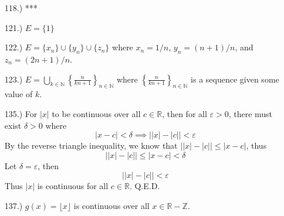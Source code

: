 \documentclass[12pt]{article}
\newcommand{\vertb}[1]{\left\vert#1\right\vert}
\newcommand{\e}{\varepsilon}
\newcommand{\lm}[1]{\displaystyle\lim_{#1}}
\begin{document}
\begin{itemize}


    \item [118.)] ***



    \item [121.)] $E=\{1\}$

    \item [122.)] $E=\{x_n\}\cup\{y_n\}\cup\{z_n\}$ where $x_n=1/n$, $y_n=(n+1)/n$, and $z_n=(2n+1)/n$.

    \item [123.)] $E=\displaystyle\bigcup_{k\in\mathbb{N}}\left\{\frac{n}{kn+1}\right\}_{n\in\mathbb{N}}$ where $\displaystyle\left\{\frac{n}{kn+1}\right\}_{n\in\mathbb{N}}$ is a sequence given some value of $k$.




    \item [135.)] For $\vertb{x}$ to be continuous over all $c\in\mathbb{R}$, then for all $\e>0$, there must exist $\delta>0$ where
    \[\vertb{x-c}<\delta\implies\big\vert{\vertb{x}-\vertb{c}}\big\vert<\e\]
    By the reverse triangle inequality, we know that $\big\vert{\vertb{x}-\vertb{c}}\big\vert\leq\vertb{x-c}$, thus
    \[\big\vert{\vertb{x}-\vertb{c}}\big\vert\leq\vertb{x-c}<\delta\]
    Let $\delta=\e$, then
    \[\big\vert{\vertb{x}-\vertb{c}}\big\vert<\e\]
    Thus $\vertb{x}$ is continuous for all $c\in\mathbb{R}$. Q.E.D.


    \item [137.)] $g(x)=\lfloor x\rfloor$ is continuous over all $x\in\mathbb{R}-\mathbb{Z}$.


\end{itemize}
\end{document}
